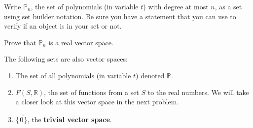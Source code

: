 \bq\label{vse} \be
\item Write $\mathbb{P}_n$, the set of polynomials (in variable $t$) with degree at most $n$, as a set using set builder notation. Be sure you have a statement that you can use to verify if an object is in your set or not.
\item Prove that $\mathbb{P}_n$ is a real vector space.
\begin{annotation}
\end{annotation}
\ee
\eq
\begin{example}
The following sets are also vector spaces:
\begin{enumerate}
\item The set of all polynomials (in variable $t$) denoted $\mathbb{P}$.
\item $F(S,\mathbb{R})$, the set of functions from a set $S$ to the real numbers. We will take a closer look at this vector space in the next problem.
\item $\{\vec{0}\}$, the \textbf{trivial vector space}.
\end{enumerate}
\end{example}


